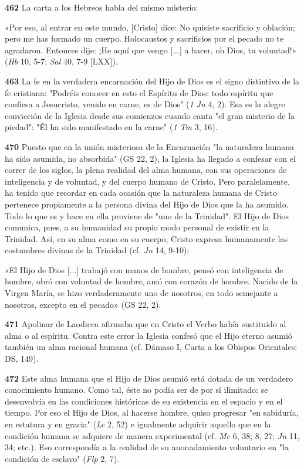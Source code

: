 \documentclass[]{article}
\begin{document}
\textbf{462} La carta a los Hebreos habla del mismo misterio:

«Por eso, al entrar en este mundo, {[}Cristo{]} dice: No quisiste
sacrificio y oblación; pero me has formado un cuerpo. Holocaustos y
sacrificios por el pecado no te agradaron. Entonces dije: ¡He aquí que
vengo {[}...{]} a hacer, oh Dios, tu voluntad!» (\emph{Hb} 10, 5-7;
\emph{Sal} 40, 7-9 {[}LXX{]}).

\textbf{463} La fe en la verdadera encarnación del Hijo de Dios es el
signo distintivo de la fe cristiana: "Podréis conocer en esto el
Espíritu de Dios: todo espíritu que confiesa a Jesucristo, venido en
carne, es de Dios" (\emph{1 Jn} 4, 2). Esa es la alegre convicción de la
Iglesia desde sus comienzos cuando canta "el gran misterio de la
piedad": "Él ha sido manifestado en la carne" (\emph{1 Tm} 3, 16).

\textbf{470} Puesto que en la unión misteriosa de la Encarnación "la
naturaleza humana ha sido asumida, no absorbida" (GS 22, 2), la Iglesia
ha llegado a confesar con el correr de los siglos, la plena realidad del
alma humana, con sus operaciones de inteligencia y de voluntad, y del
cuerpo humano de Cristo. Pero paralelamente, ha tenido que recordar en
cada ocasión que la naturaleza humana de Cristo pertenece propiamente a
la persona divina del Hijo de Dios que la ha asumido. Todo lo que es y
hace en ella proviene de "uno de la Trinidad". El Hijo de Dios comunica,
pues, a su humanidad su propio modo personal de existir en la Trinidad.
Así, en su alma como en su cuerpo, Cristo expresa humanamente las
costumbres divinas de la Trinidad (cf. \emph{Jn} 14, 9-10):

«El Hijo de Dios {[}...{]} trabajó con manos de hombre, pensó con
inteligencia de hombre, obró con voluntad de hombre, amó con corazón de
hombre. Nacido de la Virgen María, se hizo verdaderamente uno de
nosotros, en todo semejante a nosotros, excepto en el pecado» (GS 22,
2).

\textbf{471} Apolinar de Laodicea afirmaba que en Cristo el Verbo había
sustituido al alma o al espíritu. Contra este error la Iglesia confesó
que el Hijo eterno asumió también un alma racional humana (cf. Dámaso I,
Carta a los Obispos Orientales: DS, 149).

\textbf{472} Este alma humana que el Hijo de Dios asumió está dotada de
un verdadero conocimiento humano. Como tal, éste no podía ser de por sí
ilimitado: se desenvolvía en las condiciones históricas de su existencia
en el espacio y en el tiempo. Por eso el Hijo de Dios, al hacerse
hombre, quiso progresar "en sabiduría, en estatura y en gracia"
(\emph{Lc} 2, 52) e igualmente adquirir aquello que en la condición
humana se adquiere de manera experimental (cf. \emph{Mc} 6, 38; 8, 27;
\emph{Jn} 11, 34; etc.). Eso correspondía a la realidad de su
anonadamiento voluntario en "la condición de esclavo" (\emph{Flp} 2, 7).
\end{document}
